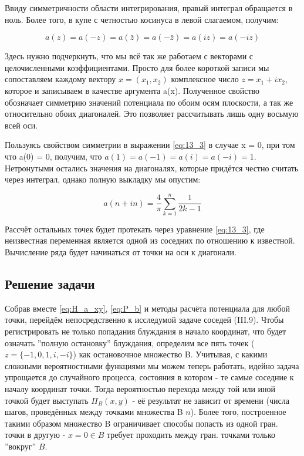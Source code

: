 Ввиду симметричности области интегрирования, правый интеграл обращается в ноль. Более того, в купе с четностью косинуса в левой слагаемом, получим:

\[ a(z) = a(-z) = a( \bar z) = a(- \bar z) = a(i z) = a( -iz)\]

Здесь нужно подчеркнуть, что мы всё так же работаем с векторами с целочисленными коэффициентами. 
Просто для более короткой записи мы сопоставляем каждому вектору $x = (x_1, x_2)$ комплексное число $z = x_1 + i x_2$, которое и записываем в качестве аргумента a(x).
Полученное свойство обозначает симметрию значений потенциала по обоим осям плоскости, а так же относительно обоих диагоналей. 
Это позволяет рассчитывать лишь одну восьмую всей оси.

Пользуясь свойством симметрии в выражении \ref{eq:13_3} в случае x = 0, при том что a(0) = 0, получим, что $a(1) = a(-1) = a(i) = a(-i) = 1$.
Нетронутыми остались значения на диагоналях, которые придётся честно считать через интеграл, однако полную выкладку мы опустим:

\begin{equation}
 a(n + i n) = \frac{4}{\pi} \sum_{k=1}^{n} \frac{1}{2k-1} 
 \label{eq:diag_a}
\end{equation}

Рассчёт остальных точек будет протекать через уравнение \ref{eq:13_3}, где неизвестная переменная является одной из соседних по отношению к известной.
Вычисление ряда будет начинаться от точки на оси к диагонали.

\subsection{Решение задачи}

Собрав вместе \ref{eq:H_a_xy}, \ref{eq:P_b} и методы расчёта потенциала для любой точки, перейдём непосредственно к исследумой задаче соседей (III.9).
Чтобы регистрировать не только попадания блуждания в начало координат, что будет означать ''полную остановку'' блуждания, определим все пять точек ($z = \{ -1, 0, 1, i, -i \}$) как остановочное множество B. 
Учитывая, с какими сложными вероятностными функциями мы можем теперь работать, идейно задача упрощается до случайного процесса, состояния в котором - те самые соседние к началу координат точки.
Тогда вероятностью перехода между той или иной точкой будет выступать $\Pi_B(x,y)$ - её результат не зависит от времени (числа шагов, проведённых между точками множества B $n$).
Более того, построенное такими образом множество B ограничивает способы попасть из одной гран. точки в другую - $x = 0 \in B$ требует проходить между гран. точками только ''вокруг'' $B$. 


